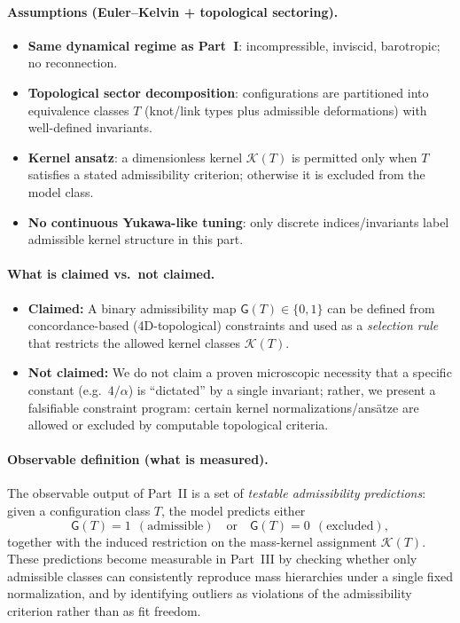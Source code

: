 \documentclass[11pt, a4paper]{article}
\begin{document}
\paragraph{Assumptions (Euler--Kelvin + topological sectoring).}
\begin{itemize}
    \item \textbf{Same dynamical regime as Part~I}: incompressible, inviscid, barotropic; no reconnection.
    \item \textbf{Topological sector decomposition}: configurations are partitioned into equivalence classes $T$ (knot/link types plus admissible deformations) with well-defined invariants.
    \item \textbf{Kernel ansatz}: a dimensionless kernel $\mathcal{K}(T)$ is permitted only when $T$ satisfies a stated admissibility criterion; otherwise it is excluded from the model class.
    \item \textbf{No continuous Yukawa-like tuning}: only discrete indices/invariants label admissible kernel structure in this part.
\end{itemize}

\paragraph{What is claimed vs.\ not claimed.}
\begin{itemize}
    \item \textbf{Claimed:} A binary admissibility map $\mathsf{G}(T)\in\{0,1\}$ can be defined from concordance-based (4D-topological) constraints and used as a \emph{selection rule} that restricts the allowed kernel classes $\mathcal{K}(T)$.
    \item \textbf{Not claimed:} We do not claim a proven microscopic necessity that a specific constant (e.g.\ $4/\alpha$) is ``dictated'' by a single invariant; rather, we present a falsifiable constraint program: certain kernel normalizations/ans\"atze are allowed or excluded by computable topological criteria.
\end{itemize}

\paragraph{Observable definition (what is measured).}
The observable output of Part~II is a set of \emph{testable admissibility predictions}:
given a configuration class $T$, the model predicts either
\begin{equation}
\mathsf{G}(T)=1 \ \ (\text{admissible}) \quad \text{or} \quad \mathsf{G}(T)=0 \ \ (\text{excluded}),
\label{eq:obs_partII_gate}
\end{equation}
together with the induced restriction on the mass-kernel assignment $\mathcal{K}(T)$.
These predictions become measurable in Part~III by checking whether only admissible classes can consistently reproduce mass hierarchies under a single fixed normalization, and by identifying outliers as violations of the admissibility criterion rather than as fit freedom.
\end{document}
